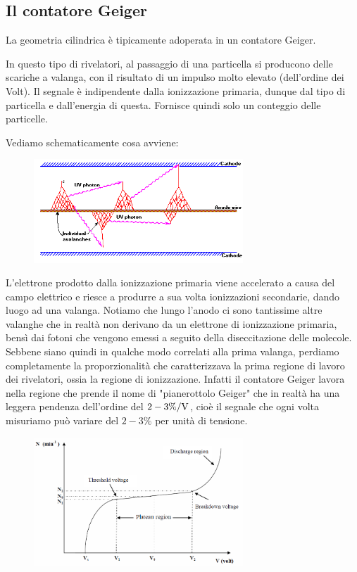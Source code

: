 \subsection{Il contatore Geiger}

La geometria cilindrica è tipicamente adoperata in un contatore Geiger.

In questo tipo di rivelatori, al passaggio di una particella si producono delle scariche a valanga, con il risultato di un impulso molto elevato (dell'ordine dei Volt). Il segnale è indipendente dalla ionizzazione primaria, dunque dal tipo di particella e dall'energia di questa. Fornisce quindi solo un conteggio delle particelle.

Vediamo schematicamente cosa avviene:
\begin{figure}[H]
   \centering
   \includegraphics[width=0.7\textwidth]{immagini/contatore_geiger_valanghe.png}
\end{figure}
L'elettrone prodotto dalla ionizzazione primaria viene accelerato a causa del campo elettrico e riesce a produrre a sua volta ionizzazioni secondarie, dando luogo ad una valanga. Notiamo che lungo l'anodo ci sono tantissime altre valanghe che in realtà non derivano da un elettrone di ionizzazione primaria, bensì dai fotoni che vengono emessi a seguito della diseccitazione delle molecole. Sebbene siano quindi in qualche modo correlati alla prima valanga, perdiamo completamente la proporzionalità che caratterizzava la prima regione di lavoro dei rivelatori, ossia la regione di ionizzazione. Infatti il contatore Geiger lavora nella regione che prende il nome di "pianerottolo Geiger" che in realtà ha una leggera pendenza dell'ordine del $2-3\%/ \rm V$, cioè il segnale che ogni volta misuriamo può variare del $2-3\%$ per unità di tensione. %
\begin{figure}[H]
   \centering
   \includegraphics[width=0.7\textwidth]{immagini/Geiger_plateau.png}
\end{figure}
